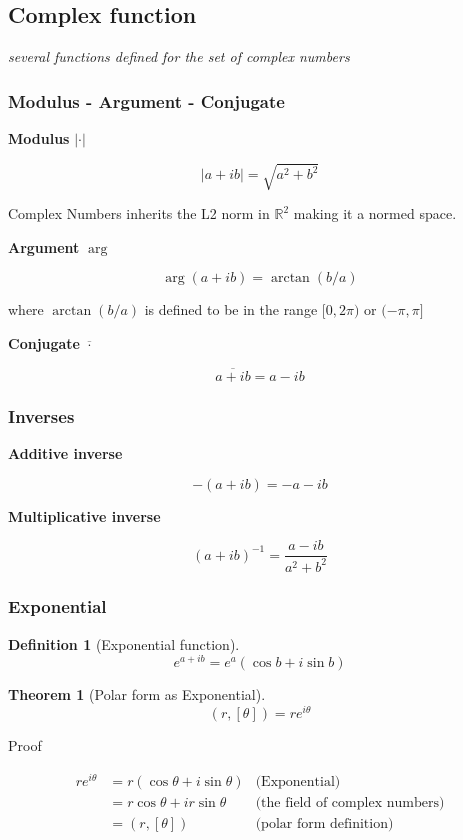 \documentclass{article}
\newtheorem{theorem}{Theorem}
\newtheorem{definition}{Definition}
\begin{document}
\subsection{Complex function}
\emph{several functions defined for the set of complex numbers}

\subsubsection{Modulus - Argument - Conjugate}

\textbf{Modulus} $|\cdot|$

$$
    |a + ib| = \sqrt{a^2 + b^2}
$$

Complex Numbers inherits the L2 norm in $\mathbb{R}^2$ making it a normed space.

\textbf{Argument} $\arg$

$$
    \arg (a + ib) = \arctan (b/a)
$$

where $\arctan (b/a)$ is defined to be in the range $[0, 2\pi)$ or $(-\pi, \pi]$

\textbf{Conjugate} $\overline{\cdot}$

$$
    \overline{a + ib} = a - ib
$$

\subsubsection{Inverses}

\noindent
\textbf{Additive inverse}

$$
    - (a + ib) = - a - ib
$$

\textbf{Multiplicative inverse}

$$
    (a + ib)^{-1} = \frac{a - ib}{a^2 + b^2}
$$

\subsubsection{Exponential}

\begin{definition}[Exponential function]
$$
    e^{a + ib} = e^a (\cos b + i \sin b)
$$    
\end{definition}

\begin{theorem}[Polar form as Exponential]
$$
    (r, [\theta]) = r e^{i\theta}
$$
\end{theorem}

Proof

\begin{align*}
    r e^{i\theta}   &= r (\cos \theta + i \sin \theta) &\text{(Exponential)}\\
                    &= r \cos \theta + i r \sin \theta &\text{(the field of complex numbers)}\\
                    &= (r, [\theta]) &\text{(polar form definition)}\\
\end{align*}
\end{document}
